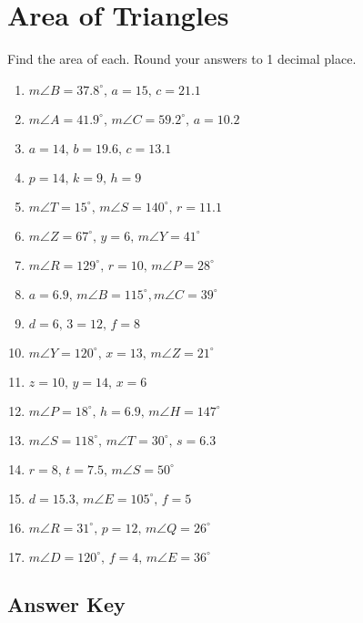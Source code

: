 \chapter{Area of Triangles}

Find the area of each. Round your answers to 1 decimal place.

\begin{enumerate}
	\item $m\angle B = 37.8^\circ, \, a = 15, \, c = 21.1$
    \item $m\angle A = 41.9^\circ, \, m\angle C = 59.2^\circ, \, a = 10.2$
    \item $a = 14, \, b = 19.6, \, c = 13.1$
    
    \item $p = 14, \, k = 9, \, h = 9$
    \item $m\angle T = 15^\circ, \, m\angle S = 140^\circ, \, r = 11.1$
    \item $m\angle Z = 67^\circ, \, y = 6, \, m\angle Y = 41^\circ$
    \item $m\angle R = 129^\circ, \, r = 10, \, m\angle P = 28^\circ$
    \item $a = 6.9, \, m\angle B = 115^\circ, m\angle C = 39^\circ$
    \item $d = 6, \, 3 = 12, \, f = 8$
    \item $m\angle Y = 120^\circ, \, x = 13, \, m\angle Z = 21^\circ$
    \item $z = 10, \, y = 14, \, x = 6$
    \item $m\angle P = 18^\circ, \, h = 6.9, \, m\angle H = 147^\circ$
    \item $m\angle S = 118^\circ, \, m\angle T = 30^\circ, \, s = 6.3$
    \item $r = 8, \, t = 7.5, \, m\angle S = 50^\circ$
    \item $d = 15.3, \, m\angle E = 105^\circ, \, f = 5$
    \item $m\angle R = 31^\circ, \, p = 12, \, m\angle Q = 26^\circ$
    \item $m\angle D = 120^\circ, \, f = 4, \, m\angle E = 36^\circ$
\end{enumerate}

\newpage

\section{Answer Key}

